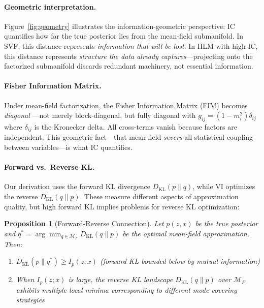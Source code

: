 \documentclass[10pt]{article} %
\theoremstyle{plain}
\newtheorem{proposition}[theorem]{Proposition}
\theoremstyle{definition}
\newcommand{\MI}{I}
\newcommand{\KL}{D_{\mathrm{KL}}}
\begin{document}
\paragraph{Geometric interpretation.} Figure~\ref{fig:geometry} illustrates the information-geometric perspective: IC quantifies how far the true posterior lies from the mean-field submanifold. In SVF, this distance represents \emph{information that will be lost}. In HLM with high IC, this distance represents \emph{structure the data already captures}---projecting onto the factorized submanifold discards redundant machinery, not essential information.

\paragraph{Fisher Information Matrix.} Under mean-field factorization, the Fisher Information Matrix (FIM) becomes \emph{diagonal} \citep{amari2016information}---not merely block-diagonal, but fully diagonal with $g_{ij} = (1 - m_i^2)\delta_{ij}$ where $\delta_{ij}$ is the Kronecker delta. All cross-terms vanish because factors are independent. This geometric fact---that mean-field \emph{severs} all statistical coupling between variables---is what IC quantifies.

\paragraph{Forward vs.\ Reverse KL.} Our derivation uses the forward KL divergence $\KL(p \| q)$, while VI optimizes the reverse $\KL(q \| p)$. These measure different aspects of approximation quality, but high forward KL implies problems for reverse KL optimization:

\begin{proposition}[Forward-Reverse Connection]
\label{prop:forward-reverse}
Let $p(z,x)$ be the true posterior and $q^* = \arg\min_{q \in \mathcal{M}_F} \KL(q \| p)$ be the optimal mean-field approximation. Then:
\begin{enumerate}
    \item $\KL(p \| q^*) \geq \MI_p(z;x)$ (forward KL bounded below by mutual information)
    \item When $\MI_p(z;x)$ is large, the reverse KL landscape $\KL(q \| p)$ over $\mathcal{M}_F$ exhibits multiple local minima corresponding to different mode-covering strategies
\end{enumerate}
\end{proposition}
\end{document}
